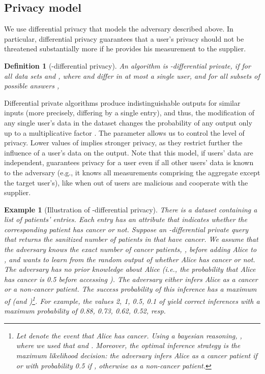 \documentclass[11pt,a4paper]{article}
\theoremstyle{plain}
\newtheorem{definition}{Definition}
\theoremstyle{plain}
\theoremstyle{plain}
\newtheorem{example}{Example}
\theoremstyle{plain}
\theoremstyle{nonumberplain} \theoremseparator{}
\begin{document}
\subsection{Privacy model}
We use differential privacy \cite{dwork06tcc} that models the adversary described above. 
In particular, differential privacy guarantees that a user's privacy should not be threatened substantially more if he provides his measurement to the supplier. 

\begin{definition}[-differential privacy]
\label{def:diff_priv_stand}
An algorithm  is -differential private, if for all
data sets  and , where  and  differ in at most a single user,
and for all subsets of possible answers ,

\end{definition}

Differential private algorithms produce indistinguishable outputs for similar inputs (more precisely, differing by a single entry), and thus, the modification of any single user's data in the dataset changes the probability of any output only up to a multiplicative factor . The parameter  allows us to control the level of privacy. Lower values of  implies stronger privacy, as they restrict further the influence of a user's data on the output. 
Note that this model, if users' data are independent, guarantees privacy for a user even if all other users' data is known to the adversary (e.g., it knows all measurements comprising the aggregate except the target user's), like when  out of  users are malicious and cooperate with the supplier. 

\begin{example}[Illustration of -differential privacy]
There is a dataset  containing a list of patients' entries. Each entry has an attribute that indicates whether the corresponding patient has cancer or not. Suppose an -differential private query  that returns the sanitized number of patients in  that have cancer. We assume that the adversary knows the exact number of cancer patients, , before adding Alice to , and wants to learn from the  random output  of  whether Alice has cancer or not. The adversary has no prior knowledge about Alice (i.e., the probability that Alice has cancer is 0.5 before accessing ). The adversary either infers Alice as a cancer or a non-cancer patient.   
The success probability of this inference has a maximum of  (and )\footnote{Let  denote the event that Alice has cancer. Using a bayesian reasoning, , where we used that  and  . Moreover, the optimal inference strategy is the maximum likelihood decision: the adversary infers Alice as a cancer patient if  or with probability 0.5 if , otherwise as a non-cancer patient.}. For example, the values 2, 1, 0.5, 0.1 of  yield correct inferences with a maximum probability of 0.88, 0.73, 0.62, 0.52, resp.   
\end{example}
\end{document}
